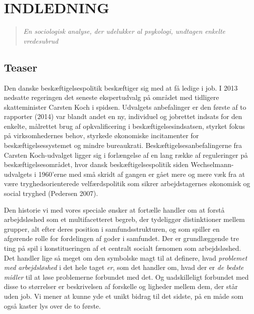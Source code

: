 
\chapter{INDLEDNING} \label{intro}

\begin{quote} \small %
\emph{En sociologisk analyse, der udelukker al psykologi, undtagen enkelte vredesubrud} 
\end{quote}
%




\section{Teaser \label{}}

Den danske beskæftigelsespolitik beskæftiger sig med at få ledige i job. I 2013 nedsatte regeringen det seneste ekspertudvalg på området med tidligere skatteminister Carsten Koch i spidsen. Udvalgets anbefalinger er den første af to rapporter (2014) var blandt andet en ny, individuel og jobrettet indsats for den enkelte, målrettet brug af opkvalificering i beskæftigelsesindsatsen, styrket fokus på virksomhedernes behov, styrkede økonomiske incitamenter for beskæftigelsessystemet og mindre bureaukrati. Beskæftigelsesanbefalingerne fra Carsten Koch-udvalget ligger sig i forlængelse af en lang række af reguleringer på beskæftigelsesområdet, hvor dansk beskæftigelsespolitik siden Wechselmann-udvalgets i 1960'erne med små skridt af gangen er gået mere og mere væk fra at være tryghedsorienterede velfærdspolitik som sikrer arbejdstagernes økonomisk og social tryghed (Pedersen 2007).

Den historie vi med vores speciale ønsker at fortælle handler om at forstå arbejdsløshed som et multifacetteret begreb, der tydeliggør distinktioner mellem grupper, alt efter deres position i samfundsstrukturen, og som spiller en afgørende rolle for fordelingen af goder i samfundet. Der er grundlæggende tre ting på spil i konstitueringen af et centralt socialt fænomen som arbejdsløshed. Det handler lige så meget om den symbolske magt til at definere, hvad \emph{problemet med arbejdsløshed} i det hele taget \emph{er}, som det handler om, hvad der er \emph{de bedste midler} til at løse problemerne forbundet med det. Og uadskilleligt forbundet med disse to størrelser er beskrivelsen af forskelle og ligheder mellem dem, der står uden job. Vi mener at kunne yde et unikt bidrag til det sidste, på en måde som også kaster lys over de to første.



